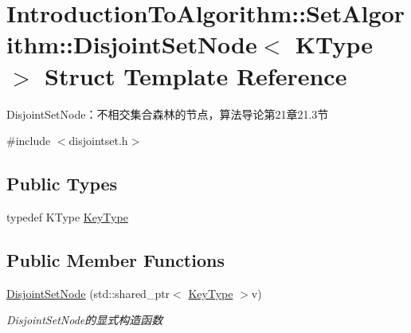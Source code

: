 \hypertarget{struct_introduction_to_algorithm_1_1_set_algorithm_1_1_disjoint_set_node}{}\section{Introduction\+To\+Algorithm\+:\+:Set\+Algorithm\+:\+:Disjoint\+Set\+Node$<$ K\+Type $>$ Struct Template Reference}
\label{struct_introduction_to_algorithm_1_1_set_algorithm_1_1_disjoint_set_node}


Disjoint\+Set\+Node：不相交集合森林的节点，算法导论第21章21.3节  




{\ttfamily \#include $<$disjointset.\+h$>$}

\subsection*{Public Types}
\begin{DoxyCompactItemize}
\item 
typedef K\+Type \hyperlink{struct_introduction_to_algorithm_1_1_set_algorithm_1_1_disjoint_set_node_a8f801679de129d80a99ad683430c534a}{Key\+Type}
\end{DoxyCompactItemize}
\subsection*{Public Member Functions}
\begin{DoxyCompactItemize}
\item 
\hyperlink{struct_introduction_to_algorithm_1_1_set_algorithm_1_1_disjoint_set_node_a579c4ac62902b32c0bd04ccea02536ea}{Disjoint\+Set\+Node} (std\+::shared\+\_\+ptr$<$ \hyperlink{struct_introduction_to_algorithm_1_1_set_algorithm_1_1_disjoint_set_node_a8f801679de129d80a99ad683430c534a}{Key\+Type} $>$v)
\begin{DoxyCompactList}\small\item\em Disjoint\+Set\+Node的显式构造函数 \end{DoxyCompactList}\end{DoxyCompactItemize}
